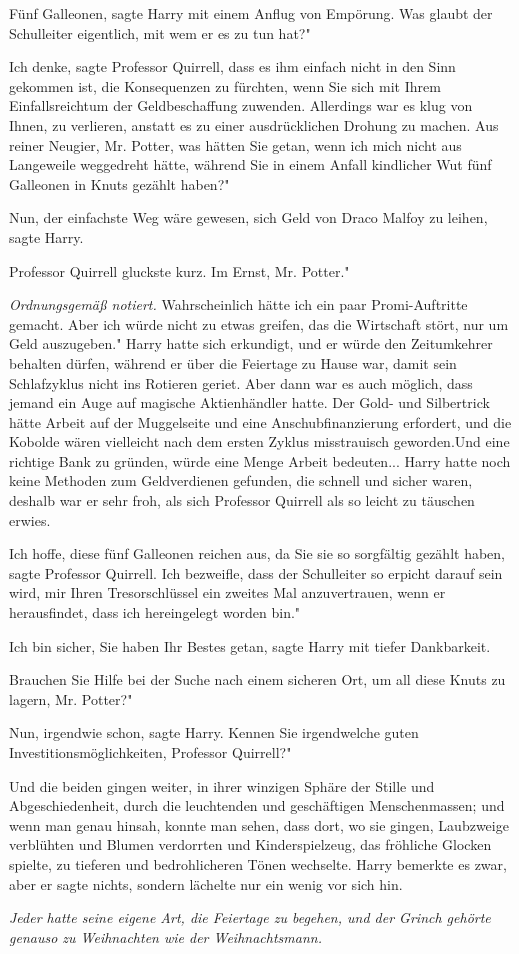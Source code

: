 \glqq Fünf Galleonen\grqq{}, sagte Harry mit einem Anflug von Empörung. \glqq
Was glaubt der Schulleiter eigentlich, mit wem er es zu tun hat?"

\glqq Ich denke\grqq{}, sagte Professor Quirrell, \glqq dass es ihm einfach
nicht in den Sinn gekommen ist, die Konsequenzen zu fürchten, wenn Sie sich mit
Ihrem Einfallsreichtum der Geldbeschaffung zuwenden. Allerdings war es klug von
Ihnen, zu verlieren, anstatt es zu einer ausdrücklichen Drohung zu machen. Aus
reiner Neugier, Mr. Potter, was hätten Sie getan, wenn ich mich nicht aus
Langeweile weggedreht hätte, während Sie in einem Anfall kindlicher Wut fünf
Galleonen in Knuts gezählt haben?"

\glqq Nun, der einfachste Weg wäre gewesen, sich Geld von Draco Malfoy zu
leihen\grqq{}, sagte Harry.

Professor Quirrell gluckste kurz. \glqq Im Ernst, Mr. Potter."

\emph{ Ordnungsgemäß notiert.}
\glqq Wahrscheinlich hätte ich ein paar Promi-Auftritte gemacht. Aber ich würde
nicht zu etwas greifen, das die Wirtschaft stört, nur um Geld auszugeben." Harry
hatte sich erkundigt, und er würde den Zeitumkehrer behalten dürfen, während er
über die Feiertage zu Hause war, damit sein Schlafzyklus nicht ins Rotieren
geriet. Aber dann war es auch möglich, dass jemand ein Auge auf magische
Aktienhändler hatte. Der Gold- und Silbertrick hätte Arbeit auf der Muggelseite
und eine Anschubfinanzierung erfordert, und die Kobolde wären vielleicht nach
dem ersten Zyklus misstrauisch geworden.Und eine richtige Bank zu gründen, würde
eine Menge Arbeit bedeuten... Harry hatte noch keine Methoden zum Geldverdienen
gefunden, die schnell und sicher waren, deshalb war er sehr froh, als sich
Professor Quirrell als so leicht zu täuschen erwies.

\glqq Ich hoffe, diese fünf Galleonen reichen aus, da Sie sie so sorgfältig
gezählt haben\grqq{}, sagte Professor Quirrell. \glqq Ich bezweifle, dass der
Schulleiter so erpicht darauf sein wird, mir Ihren Tresorschlüssel ein zweites
Mal anzuvertrauen, wenn er herausfindet, dass ich hereingelegt worden bin."

\glqq Ich bin sicher, Sie haben Ihr Bestes getan\grqq{}, sagte Harry mit tiefer
Dankbarkeit.

\glqq Brauchen Sie Hilfe bei der Suche nach einem sicheren Ort, um all diese
Knuts zu lagern, Mr. Potter?"

\glqq Nun, irgendwie schon\grqq{}, sagte Harry. \glqq Kennen Sie irgendwelche
guten Investitionsmöglichkeiten, Professor Quirrell?"

Und die beiden gingen weiter, in ihrer winzigen Sphäre der Stille und
Abgeschiedenheit, durch die leuchtenden und geschäftigen Menschenmassen; und
wenn man genau hinsah, konnte man sehen, dass dort, wo sie gingen, Laubzweige
verblühten und Blumen verdorrten und Kinderspielzeug, das fröhliche Glocken
spielte, zu tieferen und bedrohlicheren Tönen wechselte. Harry bemerkte es zwar,
aber er sagte nichts, sondern lächelte nur ein wenig vor sich hin.

\emph{Jeder hatte seine eigene Art, die Feiertage zu begehen, und der Grinch gehörte genauso zu Weihnachten wie der Weihnachtsmann. }

